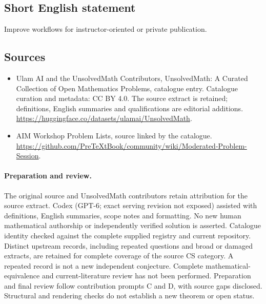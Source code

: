 \documentclass[11pt]{article}
\begin{document}
\subsection{Short English statement}
Improve workflows for instructor-oriented or private publication.
\subsection{Sources}
\begin{itemize}
\item[\hypertarget{source:statement:1}{S1}] Ulam AI and the UnsolvedMath Contributors, UnsolvedMath: A Curated Collection of Open Mathematics Problems, catalogue entry. Catalogue curation and metadata: CC BY 4.0. The source extract is retained; definitions, English summaries and qualifications are editorial additions.
\url{https://huggingface.co/datasets/ulamai/UnsolvedMath}.
\item[\hypertarget{source:statement:2}{S2}] AIM Workshop Problem Lists, source linked by the catalogue.
\url{https://github.com/PreTeXtBook/community/wiki/Moderated-Problem-Session}.
\end{itemize}
\paragraph{Preparation and review.}
The original source and UnsolvedMath contributors retain attribution for the source extract. Codex (GPT-6; exact serving revision not exposed) assisted with definitions, English summaries, scope notes and formatting. No new human mathematical authorship or independently verified solution is asserted. Catalogue identity checked against the complete supplied registry and current repository. Distinct upstream records, including repeated questions and broad or damaged extracts, are retained for complete coverage of the source CS category. A repeated record is not a new independent conjecture. Complete mathematical-equivalence and current-literature review has not been performed. Preparation and final review follow contribution prompts C and D, with source gaps disclosed. Structural and rendering checks do not establish a new theorem or open status.
\label{end:statement}
\end{document}
